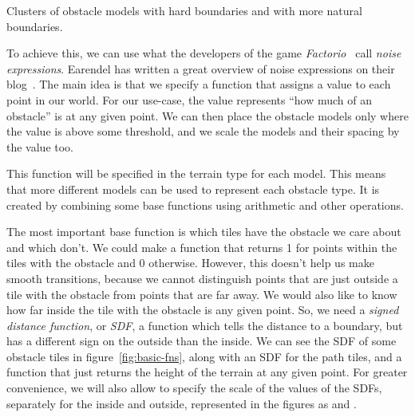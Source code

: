 \begin{center}
\begin{minipage}{.5\textwidth}
    \end{minipage}
    \caption{Clusters of obstacle models with hard boundaries and with more natural boundaries.}
    \label{fig:analysis-obstacles-natural-boundary}
\end{center}

To achieve this, we can use what the developers of the game \emph{Factorio}~\cite{Factorio} call \emph{noise expressions}.
Earendel has written a great overview of noise expressions on their blog~\cite{NoiseExpressions}.
The main idea is that we specify a function that assigns a value to each point in our world.
For our use-case, the value represents \enquote{how much of an obstacle} is at any given point.
We can then place the obstacle models only where the value is above some threshold, and we scale the models and their spacing by the value too.

This function will be specified in the terrain type for each model.
This means that more different models can be used to represent each obstacle type.
It is created by combining some base functions using arithmetic and other operations.

The most important base function is which tiles have the obstacle we care about and which don't.
We could make a function that returns 1 for points within the tiles with the obstacle and 0 otherwise.
However, this doesn't help us make smooth transitions, because we cannot distinguish points that are just outside a tile with the obstacle from points that are far away.
We would also like to know how far inside the tile with the obstacle is any given point.
So, we need a \emph{signed distance function}, or \emph{SDF}, a function which tells the distance to a boundary, but has a different sign on the outside than the inside.
We can see the SDF of some obstacle tiles in figure~\ref{fig:basic-fns}, along with an SDF for the path tiles, and a function that just returns the height of the terrain at any given point.
For greater convenience, we will also allow to specify the scale of the values of the SDFs, separately for the inside and outside, represented in the figures as  and .

